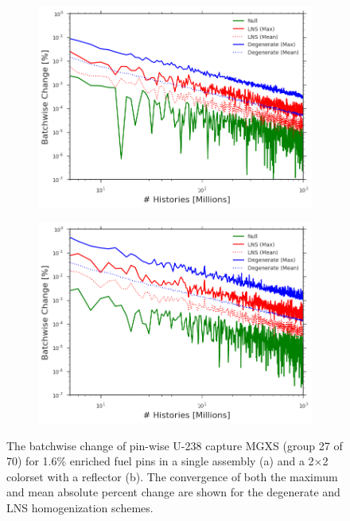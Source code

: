 \clearpage


\begin{figure}[h!]
\centering
\begin{subfigure}{.87\textwidth}
  \centering
  \includegraphics[width=\linewidth]{figures/patterns/convergence/assm-16/assm-16-capt}
  \caption{}
  \label{fig:chap9-assm-16-converge}
\end{subfigure}
\begin{subfigure}{.87\textwidth}
  \centering
  \includegraphics[width=\linewidth]{figures/patterns/convergence/reflector/16-enr-capt}
  \caption{}
  \label{fig:chap9-reflector-converge}
\end{subfigure}
\caption[Convergence of pin-wise U-238 capture MGXS]{The batchwise change of pin-wise U-238 capture \ac{MGXS} (group 27 of 70) for 1.6\% enriched fuel pins in a single assembly (a) and a 2$\times$2 colorset with a reflector (b). The convergence of both the maximum and mean absolute percent change are shown for the degenerate and \ac{LNS} homogenization schemes.}
\label{fig:chap9-converge}
\end{figure}
